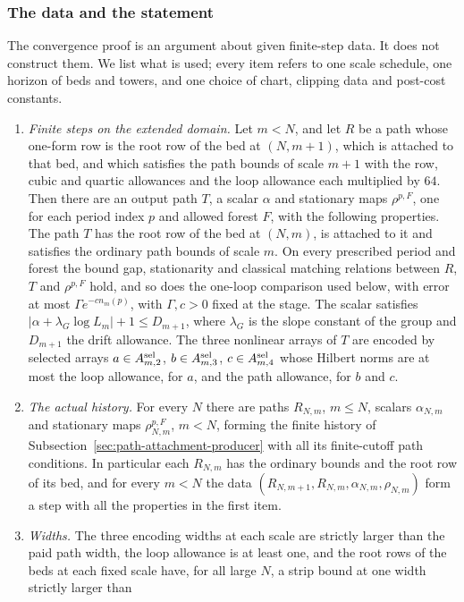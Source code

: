 \subsubsection{The data and the statement}
The convergence proof is an argument about given finite-step data.
It does not construct them. We list what is used; every item refers
to one scale schedule, one horizon of beds and towers, and one choice
of chart, clipping data and post-cost constants.
\begin{enumerate}
\item \emph{Finite steps on the extended domain.} Let $m<N$, and let
$R$ be a path whose one-form row is the root row of the bed at
$(N,m+1)$, which is attached to that bed, and which satisfies the path
bounds of scale $m+1$ with the row, cubic and quartic allowances and
the loop allowance each multiplied by $64$. Then there are an output
path $T$, a scalar $\alpha$ and stationary maps $\rho^{p,F}$, one for
each period index $p$ and allowed forest $F$, with the following
properties. The path $T$ has the root row of the bed at $(N,m)$, is
attached to it and satisfies the ordinary path bounds of scale $m$.
On every prescribed period and forest the bound gap, stationarity and
classical matching relations between $R$, $T$ and $\rho^{p,F}$ hold,
and so does the one-loop comparison used below, with error at most
$\Gamma e^{-cn_m(p)}$, with $\Gamma,c>0$ fixed at the stage. The scalar
satisfies
$|\alpha+\lambda_G\log L_m|+1\le D_{m+1}$, where $\lambda_G$ is the
slope constant of the group and $D_{m+1}$ the drift allowance. The
three nonlinear arrays of $T$ are encoded by selected arrays
$a\in A^{\rm sel}_{m,2}$, $b\in A^{\rm sel}_{m,3}$,
$c\in A^{\rm sel}_{m,4}$ whose Hilbert norms are at most the loop
allowance, for $a$, and the path allowance, for $b$ and $c$.
\item \emph{The actual history.} For every $N$ there are paths
$R_{N,m}$, $m\le N$, scalars $\alpha_{N,m}$ and stationary maps
$\rho^{p,F}_{N,m}$, $m<N$, forming the finite history of
Subsection~\ref{sec:path-attachment-producer} with all its finite-cutoff
path conditions. In particular each $R_{N,m}$ has the ordinary bounds
and the root row of its bed, and for every $m<N$ the data
$(R_{N,m+1},R_{N,m},\alpha_{N,m},\rho_{N,m})$ form a step with all
the properties in the first item.
\item \emph{Widths.} The three encoding widths at each scale are
strictly larger than the paid path width, the loop allowance is at
least one, and the root rows of the beds at each fixed scale have,
for all large $N$, a strip bound at one width strictly larger than

\end{enumerate}
